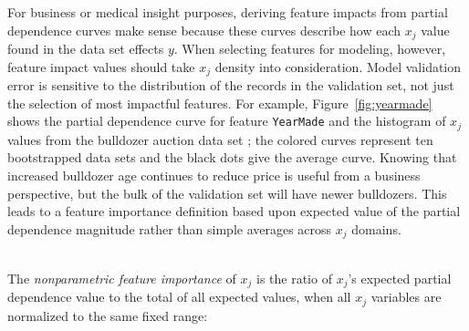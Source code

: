 \documentclass[11pt]{article}
\newcommand{\figref}[1]{Figure~\ref{#1}}
\newcommand{\eqnref}[1]{Equation~\ref{#1}}
\newcommand{\cut}[1]{}
\begin{document}
For business or medical insight purposes, deriving feature impacts from partial dependence curves make sense because these curves describe how each $x_j$ value found in the data set effects $y$. When selecting features for modeling, however, feature impact values should take $x_j$ density into consideration. Model validation error is sensitive to the distribution of the records in the validation set, not just the selection of most impactful features.  For example, \figref{fig:yearmade} shows the partial dependence curve for feature {\tt\small YearMade} and the histogram of $x_j$ values from the bulldozer auction data set \citep{bulldozer}; the colored curves represent ten bootstrapped data sets and the black dots give the average curve.  Knowing that increased bulldozer age continues to reduce price is useful from a business perspective, but the bulk of the validation set will have newer bulldozers.  This leads to a feature importance definition based upon expected value of the partial dependence magnitude rather than simple averages across $x_j$ domains.

\cut{
While feature importances should not be interpreted as feature impacts, impacts can be effective as feature importances for model feature selection.  Features with the most impact on the response variable the most should coincide with the most predictive features. But, m

The definition of impact in \eqnref{eq:Epd2a} assumes that each $x_j$ value is equally likely, which is not the case in practice for $(\bf X, y)$ data sets. To go from partial dependence to importance, the $\text{\it PD}_j$ curve at $x_j=z$ must be weighted by the number of samples at $x_j=z$ before computing the average magnitude.  The red dots represent the $\text{\it PD}_j$ weighted according to the histogram height and the orange region represents the impact {\tt\small YearMade} has on the response variable, {\tt\small SalePrice}. While the {\tt\small YearMade} partial dependence curve is plausible before year 1990 (older bulldozers are worth less), there are so few data points that the collection of very old bulldozers should have little overall effect on the overall average sale price.  This leads to a definition based upon expected value rather than simple averages across $x_j$ domains.
}

~\\
 The {\em nonparametric feature importance} of $x_j$ is the ratio of $x_j$'s expected partial dependence value to the total of all expected values, when all $x_j$ variables are normalized to the same fixed range:
\end{document}
